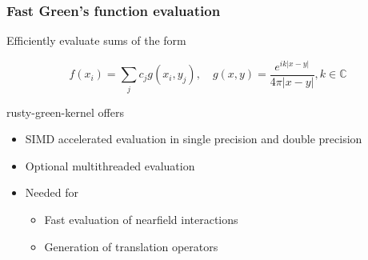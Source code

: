 \documentclass[dvipsnames,10pt]{beamer}
\begin{document}
\begin{frame}
	\frametitle{Fast Green's function evaluation}
	
	Efficiently evaluate sums of the form
	
	\begin{tcolorbox}
	$$
	f(x_i) = \sum_{j}c_jg(x_i, y_j),\quad g(x, y) = \frac{e^{ik|x-y|}}{4\pi|x-y|}, k\in\mathbb{C}
	$$
	\end{tcolorbox}

	{\color{blue} rusty-green-kernel} offers

	\begin{itemize}
		\item SIMD accelerated evaluation in single precision and double precision
		\item Optional multithreaded evaluation
		\item Needed for
			\begin{itemize}
				\item Fast evaluation of nearfield interactions
				\item Generation of translation operators
			\end{itemize}
	\end{itemize}
	
	
\end{frame}
	
\end{document}
